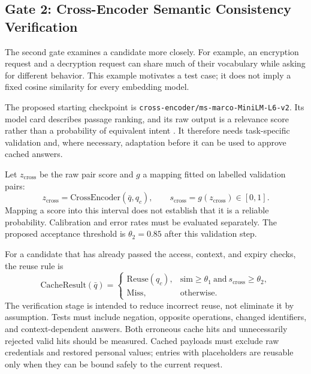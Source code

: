 \subsection{Gate 2: Cross-Encoder Semantic Consistency Verification}

The second gate examines a candidate more closely. For example, an encryption request and a decryption request can share much of their vocabulary while asking for different behavior. This example motivates a test case; it does not imply a fixed cosine similarity for every embedding model.

The proposed starting checkpoint is \texttt{cross-encoder/ms-marco-MiniLM-L6-v2}. Its model card describes passage ranking, and its raw output is a relevance score rather than a probability of equivalent intent \cite{ref:CrossEncoderModelCard}. It therefore needs task-specific validation and, where necessary, adaptation before it can be used to approve cached answers.

Let $z_{\mathrm{cross}}$ be the raw pair score and $g$ a mapping fitted on labelled validation pairs:
\begin{equation}
z_{\mathrm{cross}}=\mathrm{CrossEncoder}(\bar q,q_c),
\qquad s_{\mathrm{cross}}=g(z_{\mathrm{cross}})\in[0,1].
\end{equation}
Mapping a score into this interval does not establish that it is a reliable probability. Calibration and error rates must be evaluated separately. The proposed acceptance threshold is $\theta_2=0.85$ after this validation step.

For a candidate that has already passed the access, context, and expiry checks, the reuse rule is
\begin{equation}
\mathrm{CacheResult}(\bar q)=
\begin{cases}
\mathrm{Reuse}(q_c), & \mathrm{sim}\geq\theta_1\ \text{and}\ s_{\mathrm{cross}}\geq\theta_2,\\
\mathrm{Miss}, & \text{otherwise}.
\end{cases}
\end{equation}
The verification stage is intended to reduce incorrect reuse, not eliminate it by assumption. Tests must include negation, opposite operations, changed identifiers, and context-dependent answers. Both erroneous cache hits and unnecessarily rejected valid hits should be measured. Cached payloads must exclude raw credentials and restored personal values; entries with placeholders are reusable only when they can be bound safely to the current request.

